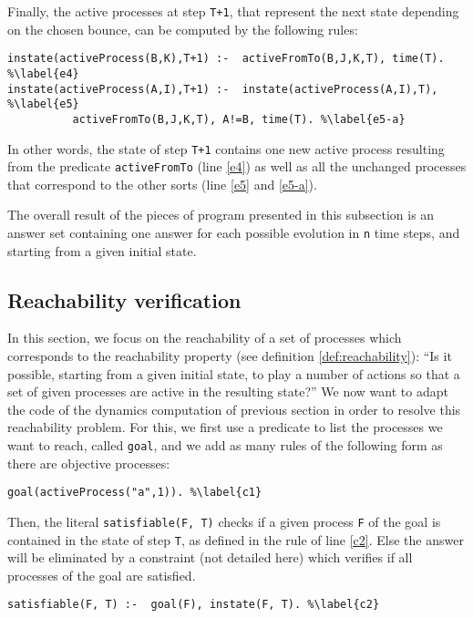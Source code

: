 Finally, the active processes at step \texttt{T+1},
that represent the next state depending on the chosen bounce,
can be computed by the following rules:
\begin{lstlisting}
instate(activeProcess(B,K),T+1) :-  activeFromTo(B,J,K,T), time(T). %\label{e4}
instate(activeProcess(A,I),T+1) :-  instate(activeProcess(A,I),T), %\label{e5}
          activeFromTo(B,J,K,T), A!=B, time(T). %\label{e5-a}
\end{lstlisting}
In other words, the state of step \texttt{T+1} contains one new active process
resulting from the predicate \texttt{activeFromTo} (line \ref{e4})
as well as all the unchanged processes that correspond to the other sorts (line \ref{e5} and \ref{e5-a}).

The overall result of the pieces of program presented in this subsection
is an answer set containing one answer for each
possible evolution in \texttt{n} time steps,
and starting from a given initial state.

\subsection{Reachability verification}
In this section, we focus on the reachability of a set of processes which corresponds to the reachability property (see definition \ref{def:reachability}):
“Is it possible, starting from a given initial state, to play a number of actions so that a set of given processes are active in the resulting state?”
We now want to adapt the code of the dynamics computation of previous section in order to resolve this reachability problem.
For this, we first use a predicate to list the processes we want to reach, called \texttt{goal}, and we add as many rules of the following form as there are objective processes:
\begin{lstlisting}
goal(activeProcess("a",1)). %\label{c1}
\end{lstlisting}
Then, the literal \texttt{satisfiable(F, T)} 
checks if a given process \texttt{F} of the goal
is contained in the state of step \texttt{T},
as defined in the rule of line \ref{c2}.
Else the answer will be eliminated by a constraint (not detailed here) which verifies if all processes of the goal are satisfied.
\begin{lstlisting}
satisfiable(F, T) :-  goal(F), instate(F, T). %\label{c2}
\end{lstlisting}

